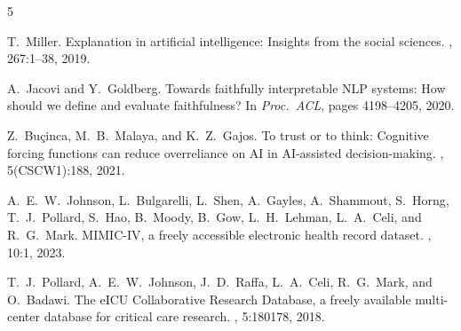 \documentclass[11pt,a4paper]{article}
\begin{document}
\renewcommand{\refname}{References}
\vspace{-0.35em}
\begin{thebibliography}{5}
\setlength{\itemsep}{0.15em}
\setlength{\parsep}{0pt}
\setlength{\parskip}{0pt}
\small

T.~Miller.
\newblock Explanation in artificial intelligence: Insights from the social sciences.
, 267:1--38, 2019.

A.~Jacovi and Y.~Goldberg.
\newblock Towards faithfully interpretable NLP systems: How should we define and evaluate faithfulness?
\newblock In {\em Proc.\ ACL}, pages 4198--4205, 2020.

Z.~Bu\c{c}inca, M.~B.~Malaya, and K.~Z.~Gajos.
\newblock To trust or to think: Cognitive forcing functions can reduce overreliance on AI in AI-assisted decision-making.
, 5(CSCW1):188, 2021.

A.~E.~W.~Johnson, L.~Bulgarelli, L.~Shen, A.~Gayles, A.~Shammout, S.~Horng, T.~J.~Pollard, S.~Hao, B.~Moody, B.~Gow, L.~H.~Lehman, L.~A.~Celi, and R.~G.~Mark.
\newblock MIMIC-IV, a freely accessible electronic health record dataset.
, 10:1, 2023.

T.~J.~Pollard, A.~E.~W.~Johnson, J.~D.~Raffa, L.~A.~Celi, R.~G.~Mark, and O.~Badawi.
\newblock The eICU Collaborative Research Database, a freely available multi-center database for critical care research.
, 5:180178, 2018.

\end{thebibliography}
\end{document}
